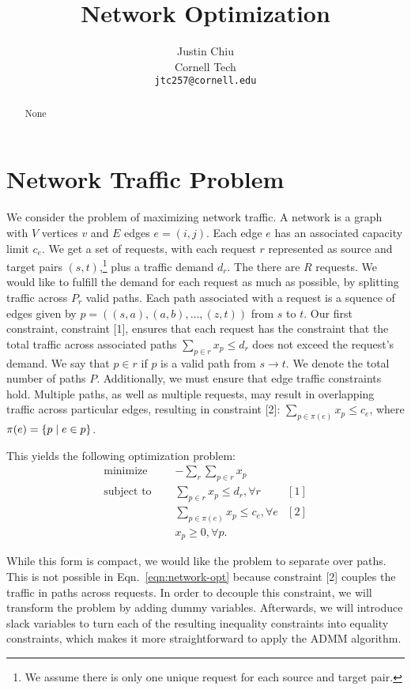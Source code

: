 \documentclass[11pt]{article}
\title{Network Optimization}
\author{Justin Chiu \\
  Cornell Tech \\
  \texttt{jtc257@cornell.edu}}
\begin{document}
\maketitle
\begin{abstract}
None
\end{abstract}

\section{Network Traffic Problem}
We consider the problem of maximizing network traffic.
A network is a graph with $V$ vertices $v$ and $E$ edges
$e = (i,j)$.
Each edge $e$ has an associated capacity limit $c_e$.
We get a set of requests,
with each request $r$ represented as source and target pairs $(s,t)$,\footnote{
We assume there is only one unique request for each source and target pair.
}
plus a traffic demand $d_r$.
The there are $R$ requests.
We would like to fulfill the demand for each request as much as possible,
by splitting traffic across $P_r$ valid paths.
Each path associated with a request is a squence of edges given by
$p = ((s,a), (a,b), \ldots, (z,t))$ from $s$ to $t$.
Our first constraint, constraint [1],
ensures that each request has the constraint that the total traffic across associated paths
$\sum_{p\in r} x_p \le d_r$ does not exceed the request's demand.
We say that $p\in r$ if $p$ is a valid path from $s\to t$.
We denote the total number of paths $P$.
Additionally, we must ensure that edge traffic constraints hold.
Multiple paths, as well as multiple requests, may result in overlapping traffic
across particular edges, resulting in constraint [2]:
$\sum_{p\in\pi(e)} x_{p} \le c_e$,
where $\pi(e) = \left\{p \mid e \in p\right\}$.

This yields the following optimization problem:
\begin{equation}
\label{eqn:network-opt}
\begin{aligned}
\textrm{minimize } \quad & -\sum_r \sum_{p\in r} x_p\\
\textrm{subject to } \quad
&\sum_{p \in r}x_p \le d_r, \forall r & [1]\\
&\sum_{p\in\pi(e)} x_p \le c_e, \forall e & [2]\\
& x_p \geq 0, \forall p.
\end{aligned}
\end{equation}

While this form is compact, we would like the problem to
separate over paths. This is not possible in Eqn.~\ref{eqn:network-opt}
because constraint [2] couples the traffic in paths across requests.
In order to decouple this constraint, we will transform the problem by adding dummy variables.
Afterwards, we will introduce slack variables to turn each of the resulting inequality constraints
into equality constraints, which makes it more straightforward to apply the ADMM algorithm.
\end{document}
